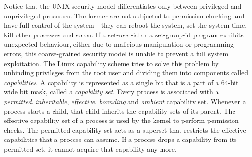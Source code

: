 Notice that the UNIX security model differentiates only between privileged and unprivileged processes.
The former are not subjected to permission checking and have full control of the system - they can 
reboot the system, set the system time, kill other processes and so on. 
If a set-user-id or a set-group-id program exhibits unexpected behaviour, either due to malicious manipulation or 
programming errors, this coarse-grained security model is unable to prevent a full system exploitation.
The Linux capability scheme tries to solve this problem by unbinding privileges from the root 
user and dividing them into components called \textit{capabilities}. A capability is represented as 
a single bit that is a part of a 64-bit wide bit mask, called a \textit{capability set}.
Every process is associated with a \textit{permitted}, \textit{inheritable}, \textit{effective}, 
\textit{bounding} and \textit{ambient} capability set. 
Whenever a process starts a child, that child inherits the capability sets of its parent.
The effective capability set of a process
is used by the kernel to perform permission checks. The permitted capability set acts as a 
superset that restricts the effective capabilities that a process can assume. 
If a process drops a capability from its permitted set, it cannot acquire that capability any more.

